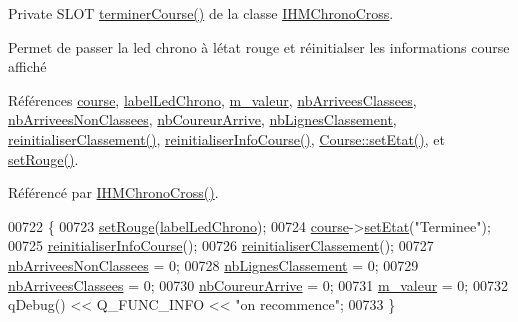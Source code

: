 Private S\+L\+OT \hyperlink{class_i_h_m_chrono_cross_ac89c6ec3040e8b787f1fbdb670405023}{terminer\+Course()} de la classe \hyperlink{class_i_h_m_chrono_cross}{I\+H\+M\+Chrono\+Cross}. 

Permet de passer la led chrono à l\textquotesingle{}état rouge et réinitialser les informations course affiché 

Références \hyperlink{class_i_h_m_chrono_cross_a03a8226c0e7f423d29302d9a06284ab4}{course}, \hyperlink{class_i_h_m_chrono_cross_ad43bab2d9a06fe2fb198c56d8b9faab2}{label\+Led\+Chrono}, \hyperlink{class_i_h_m_chrono_cross_a4bb2449f0b2cc9891c09fa3e32f56229}{m\+\_\+valeur}, \hyperlink{class_i_h_m_chrono_cross_a9bdcd0e57b79f64957eefea0f9d2b097}{nb\+Arrivees\+Classees}, \hyperlink{class_i_h_m_chrono_cross_aa3198d36b0574b477a328621c8e1e0f0}{nb\+Arrivees\+Non\+Classees}, \hyperlink{class_i_h_m_chrono_cross_aba349505e99e6e320b218ba2b7fb485e}{nb\+Coureur\+Arrive}, \hyperlink{class_i_h_m_chrono_cross_a86ed3469ca99988211bcf0970527c119}{nb\+Lignes\+Classement}, \hyperlink{class_i_h_m_chrono_cross_aaf8fa3bf16956fd0e0ceeab6e65f6741}{reinitialiser\+Classement()}, \hyperlink{class_i_h_m_chrono_cross_a1149f4f57c8cf34048f93fba6b4176b3}{reinitialiser\+Info\+Course()}, \hyperlink{class_course_a3ebcde1fa443cb20d71fb98af4d0c418}{Course\+::set\+Etat()}, et \hyperlink{class_i_h_m_chrono_cross_a3b46a31326bdde2b5ad67a9f0a6de76b}{set\+Rouge()}.



Référencé par \hyperlink{class_i_h_m_chrono_cross_a479fc90733fba3e65fb06aa4a3adc02e}{I\+H\+M\+Chrono\+Cross()}.


\begin{DoxyCode}
00722 \{
00723    \hyperlink{class_i_h_m_chrono_cross_a3b46a31326bdde2b5ad67a9f0a6de76b}{setRouge}(\hyperlink{class_i_h_m_chrono_cross_ad43bab2d9a06fe2fb198c56d8b9faab2}{labelLedChrono});
00724    \hyperlink{class_i_h_m_chrono_cross_a03a8226c0e7f423d29302d9a06284ab4}{course}->\hyperlink{class_course_a3ebcde1fa443cb20d71fb98af4d0c418}{setEtat}(\textcolor{stringliteral}{"Terminee"});
00725    \hyperlink{class_i_h_m_chrono_cross_a1149f4f57c8cf34048f93fba6b4176b3}{reinitialiserInfoCourse}();
00726    \hyperlink{class_i_h_m_chrono_cross_aaf8fa3bf16956fd0e0ceeab6e65f6741}{reinitialiserClassement}();
00727    \hyperlink{class_i_h_m_chrono_cross_aa3198d36b0574b477a328621c8e1e0f0}{nbArriveesNonClassees} = 0;
00728    \hyperlink{class_i_h_m_chrono_cross_a86ed3469ca99988211bcf0970527c119}{nbLignesClassement} = 0;
00729    \hyperlink{class_i_h_m_chrono_cross_a9bdcd0e57b79f64957eefea0f9d2b097}{nbArriveesClassees} = 0;
00730    \hyperlink{class_i_h_m_chrono_cross_aba349505e99e6e320b218ba2b7fb485e}{nbCoureurArrive} = 0;
00731    \hyperlink{class_i_h_m_chrono_cross_a4bb2449f0b2cc9891c09fa3e32f56229}{m\_valeur} = 0;
00732    qDebug() << Q\_FUNC\_INFO << \textcolor{stringliteral}{"on recommence"};
00733 \}
\end{DoxyCode}
\mbox{\label{class_i_h_m_chrono_cross_a9706094a679e33f3595e28776596a91b}} 
